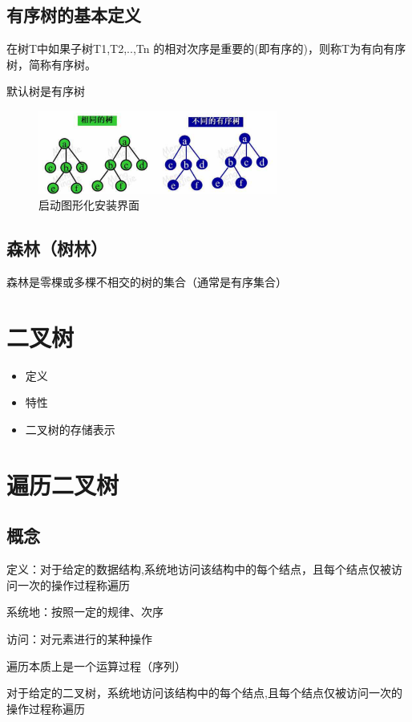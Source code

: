 \documentclass[AutoFakeBold]{LZUThesis2007}
\begin{document}
		\subsection{有序树的基本定义}
		在树T中如果子树T1,T2,..,Tn 的相对次序是重要的(即有序的)，则称T为有向有序树，简称有序树。

		默认树是有序树


\begin{figure}[H]
    \centering
    \includegraphics[width=0.7\textwidth]{figures/7.1.png}
    \caption{启动图形化安装界面}
    \label{fig_install_texlive}
\end{figure}

		\subsection{森林（树林）}
		森林是零棵或多棵不相交的树的集合（通常是有序集合）

	\section{二叉树}
		\begin{itemize}
			\item 定义
			\item 特性
			\item 二叉树的存储表示
		\end{itemize}

	\section{遍历二叉树}
		\subsection{概念}
		定义：对于给定的数据结构,系统地访问该结构中的每个结点，且每个结点仅被访问一次的操作过程称遍历

		系统地：按照一定的规律、次序

		访问：对元素进行的某种操作

		遍历本质上是一个运算过程（序列）

		对于给定的二叉树，系统地访问该结构中的每个结点,且每个结点仅被访问一次的操作过程称遍历
\end{document}
